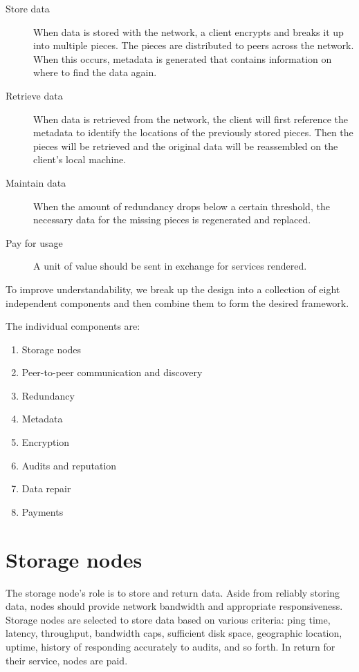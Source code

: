 \documentclass[8pt,fleqn,openany]{book}
\begin{document}
\begin{description}

\item[Store data] When data is stored with the network, a client encrypts
and breaks it up into multiple pieces. The pieces are distributed
to peers across the network. When this occurs, metadata is generated that
contains information on where to find the data again.

\item[Retrieve data] When data is retrieved from the network,
the client will first reference the metadata to identify the locations of the
previously stored pieces.
Then the pieces will be retrieved and the original data will be reassembled
on the client's local machine.

\item[Maintain data] When the amount of redundancy drops below a certain
threshold, the necessary data for the missing pieces is regenerated and
replaced.

\item[Pay for usage] A unit of value should be sent in exchange for
services rendered.

\end{description}

To improve understandability, we break up the design into a collection of eight
independent components and then combine them to form the desired framework.

The individual components are:

\begin{enumerate}
\item Storage nodes
\item Peer-to-peer communication and discovery
\item Redundancy
\item Metadata
\item Encryption
\item Audits and reputation
\item Data repair
\item Payments
\end{enumerate}

\section{Storage nodes}

The storage node's role is to store and return data.
Aside from reliably storing data, nodes should provide
network bandwidth and appropriate responsiveness.
Storage nodes are selected to store data based on various criteria: ping time,
latency, throughput, bandwidth caps, sufficient disk space,
geographic location, uptime, history of responding accurately to audits, and
so forth. In return for their service, nodes are paid.
\end{document}
